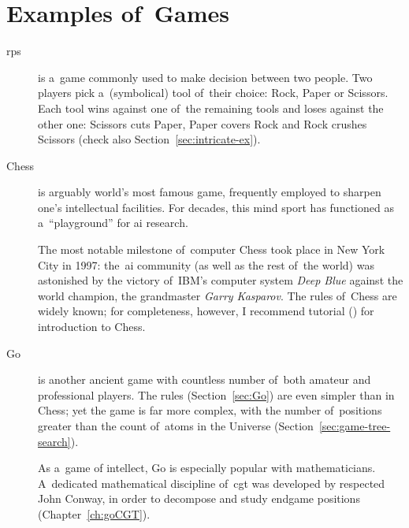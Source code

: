 \section{Examples of~Games}
\label{sec:examples-of-games}
\newcommand{\figurewidthratio}{0.3}
\begin{description}
  \item [\acrfull{rps}] is a~game commonly used to make decision between two people.
    Two players pick a~(symbolical) tool of~their choice: Rock, Paper or Scissors.
    Each tool wins against one of~the remaining tools and loses against the other one: Scissors cuts Paper, Paper covers Rock and Rock crushes Scissors (check also Section~\ref{sec:intricate-ex}).

  \item [Chess] is arguably world's most famous game, frequently employed to sharpen one's intellectual facilities.
    For decades, this mind sport has functioned as a~``playground'' for \acrfull{ai} research.

    The most notable milestone of~computer Chess took place in New York City in 1997:
    the~\acrshort{ai} community (as well as the rest of~the world) was astonished by the victory of~IBM's computer system \emph{Deep Blue} against the world champion, the grandmaster \emph{Garry Kasparov}.
    The rules of~Chess are widely known; for completeness, however, I recommend tutorial (\cite{Karpov1997disney}) for introduction to Chess.

  \item [Go] is another ancient game with countless number of~both amateur and professional players.
    The rules (Section~\ref{sec:Go}) are even simpler than in Chess; yet the game is far more complex, with the number of~positions greater than the count of~atoms in the Universe (Section~\ref{sec:game-tree-search}).

    As a~game of intellect, Go is especially popular with mathematicians.
    A~dedicated mathematical discipline of~\acrfull{cgt} was developed by respected John Conway, in order to decompose and study endgame positions (Chapter~\ref{ch:goCGT}).


\end{description}
